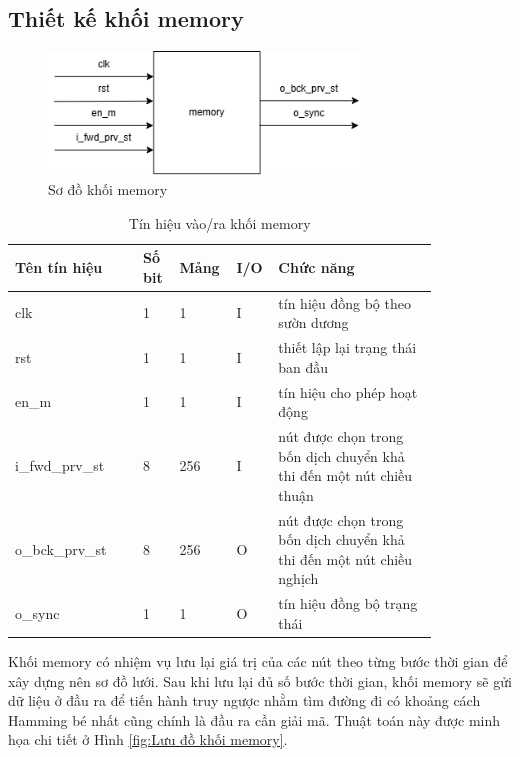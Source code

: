 \documentclass[../DoAn.tex]{subfiles}
\begin{document}
\subsection{Thiết kế khối memory}

\begin{figure}[H]
    \centering
    \includegraphics[width=0.75\textwidth, height=0.12\textheight, keepaspectratio]{Hinhve/Chuong 4/memory.png}
    \caption{Sơ đồ khối memory}
\end{figure}

\begin{table}[H]
\centering{}
    \caption{Tín hiệu vào/ra khối memory}
    \begin{tabular}{|p{0.28\linewidth}|p{0.08\linewidth}|p{0.08\linewidth}|p{0.05\linewidth}|p{0.35\linewidth}|}
        \hline
        \textbf{Tên tín hiệu} & \textbf{Số bit}  & \textbf{Mảng}     & \textbf{I/O}   & \textbf{Chức năng} \\ \hline\hline
        clk  & 1   & 1     & I     & tín hiệu đồng bộ theo sườn dương \\ \hline
        rst   & 1   & 1     & I     & thiết lập lại trạng thái ban đầu\\ \hline
        en\_m  & 1   & 1     & I     & tín hiệu cho phép hoạt động \\ \hline
        i\_fwd\_prv\_st  & 8   & 256     & I     & nút được chọn trong bốn dịch chuyển khả thi đến một nút chiều thuận  \\ \hline
        o\_bck\_prv\_st  & 8   & 256     & O     & nút được chọn trong bốn dịch chuyển khả thi đến một nút chiều nghịch \\ \hline
        o\_sync  & 1   & 1     & O     & tín hiệu đồng bộ trạng thái  \\ \hline
        \end{tabular}
\end{table}

Khối memory có nhiệm vụ lưu lại giá trị của các nút theo từng bước thời gian để xây dựng nên sơ đồ lưới. Sau khi lưu lại đủ số bước thời gian, khối memory sẽ gửi dữ liệu ở đầu ra để tiến hành truy ngược nhằm tìm đường đi có khoảng cách Hamming bé nhất cũng chính là đầu ra cần giải mã. Thuật toán này được minh họa chi tiết ở Hình \ref{fig:Lưu đồ khối memory}.
\end{document}
